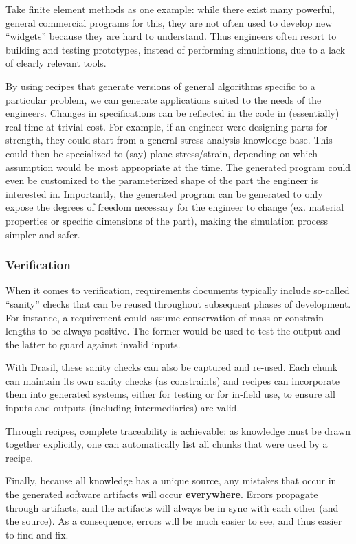 \documentclass{sig-alternate-05-2015}
\newcommand{\lss}{Drasil}
\begin{document}
Take finite element methods as one example:  while there exist many powerful,
general commercial programs for this, they are not often used to
develop new ``widgets'' because they are hard to understand.  Thus
engineers often resort to building and testing prototypes, instead of
performing simulations, due to a lack of clearly relevant tools.

By using recipes that generate versions of general algorithms specific to
a particular problem, we can generate applications suited to the needs of
the engineers.  Changes in specifications can be reflected in the code in
(essentially) real-time at trivial cost. For example, if an engineer were
designing parts for strength, they could start from a general stress analysis
knowledge base.  This could then be specialized to (say) plane stress/strain,
depending on which assumption would be most appropriate at the time. The
generated program could even be customized to the parameterized shape of
the part the engineer is interested in. Importantly, the generated program
can be generated to only expose the degrees of freedom necessary for the
engineer to change (ex. material properties or specific dimensions of the
part), making the simulation process simpler and safer.

\subsubsection{Verification} \label{sssec:adv_verify}

When it comes to verification, requirements documents typically include
so-called ``sanity'' checks that can be reused throughout subsequent phases of
development. For instance, a requirement could assume conservation of mass or
constrain lengths to be always positive. The former would be used to test the
output and the latter to guard against invalid inputs.

With \lss, these sanity checks can also be captured and re-used.  Each chunk
can maintain its own sanity checks (as constraints) and recipes can incorporate
them into generated systems, either for testing or for in-field use, to ensure
all inputs and outputs (including intermediaries) are valid.

Through recipes, complete traceability is achievable: as knowledge must be
drawn together explicitly, one can automatically list all chunks that were
used by a recipe.

Finally, because all knowledge has a unique source, any mistakes that occur in
the generated software artifacts will occur \textbf{everywhere}. Errors
propagate through artifacts, and the artifacts will always be in sync with each
other (and the source). As a consequence, errors will be much easier to see,
and thus easier to find and fix.  
\end{document}
